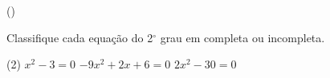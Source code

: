 \begin{question}[type=exam] () %

Classifique cada equação do 2$^\circ$ grau em completa ou incompleta.
    \begin{tasks}(2)
       \task $x^2-3=0$
        \task $-9x^2+2x+6=0$
        \task $2x^2-30=0$
    \end{tasks}
\end{question}